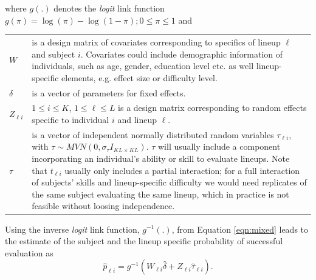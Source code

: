 \documentclass[12pt]{article}
\newcommand{\red}[1]{{\color{red} #1}}
\begin{document}
\noindent where $g(.)$ denotes the {\it logit} link function $g(\pi)=\log(\pi) - \log(1-\pi); 0 \le \pi \le 1$ and

\begin{tabular}{lp{5.5in}}
$W$  & is a design matrix of covariates corresponding to specifics of lineup $\ell$ and subject $i$. Covariates could include  demographic information of individuals, such as age, gender, education level etc. as well lineup-specific elements, e.g. effect size or difficulty level. \\
$\delta$ & is a vector of parameters for fixed effects.\\
$Z_{\ell i}$ & $1 \le i \le K$, $1 \le \ell \le L$  is a design matrix corresponding to random effects specific to individual $i$ and lineup $\ell$.  \\
$\tau$ & is a vector of independent normally distributed random variables $\tau_{\ell i}$, with  $\tau  \sim  MVN(0,\sigma_\tau I_{KL \times KL})$. $\tau$ will usually include a component incorporating an individual's ability or skill to evaluate lineups. 
Note that $t_{\ell i }$ usually only includes a partial interaction; for a full interaction of subjects' skills and lineup-specific difficulty we would need replicates of the same subject evaluating the same lineup, which in practice is not feasible without loosing independence.\\
\end{tabular}

\noindent Using the inverse {\it logit} link function, $g^{-1}(.)$, from  Equation \ref{eqn:mixed} leads to the estimate of the subject and the lineup specific probability of successful evaluation as 
\begin{equation} \label{eqn:mixed_power}
\hat p_{\ell i} =  g^{-1}(W_{\ell i} \hat {\delta} +  Z_{\ell i}  \hat {\tau}_{\ell i}).
\end{equation}


\end{document}
